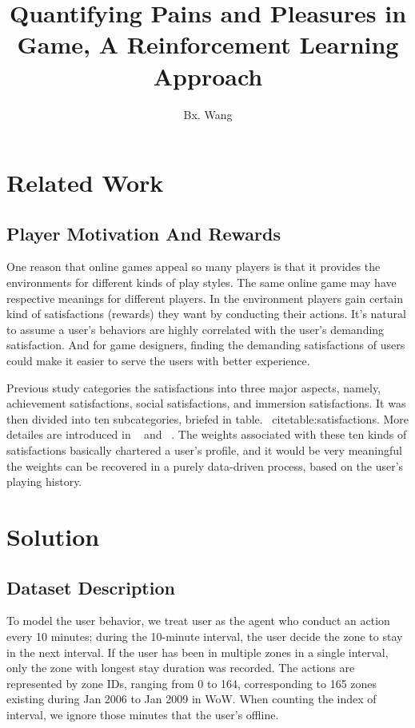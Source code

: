 \documentclass[a4paper]{article}
\title{Quantifying Pains and Pleasures in Game, A Reinforcement Learning Approach}
\author{Bx. Wang}
\begin{document}
\maketitle

\section{Related Work}

\subsection{Player Motivation And Rewards}

One reason that online games appeal so many players is that it provides the environments for different kinds of play styles. The same online game may have respective meanings for different players. In the environment players gain certain kind of satisfactions (rewards) they want by conducting their actions. It's natural to assume a user's behaviors are highly correlated with the user's demanding satisfaction. And for game designers, finding the demanding satisfactions of users could make it easier to serve the users with better experience. 

Previous study categories the satisfactions into three major aspects, namely, achievement satisfactions, social satisfactions, and immersion satisfactions. It was then divided into ten subcategories, briefed in table. ~cite{table:satisfactions}. More detailes are introduced in ~\cite{} and ~\cite{}. The weights associated with these ten kinds of satisfactions basically chartered a user's profile, and it would be very meaningful the weights can be recovered in a purely data-driven process, based on the user's playing history.

\section{Solution}

\subsection{Dataset Description}

To model the user behavior, we treat user as the agent who conduct an action every 10 minutes; during the 10-minute interval, the user decide the zone to stay in the next interval. If the user has been in multiple zones in a single interval, only the zone with longest stay duration was recorded. The actions are represented by zone IDs, ranging from 0 to 164, corresponding to 165 zones existing during Jan 2006 to Jan 2009 in WoW. When counting the index of interval, we ignore those minutes that the user's offline.
\end{document}

